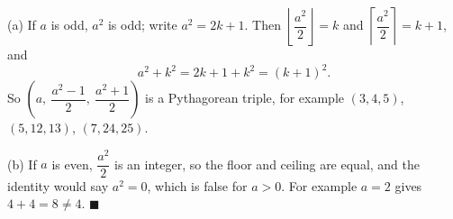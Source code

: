 (a) If \(a\) is odd, \(a^2\) is odd; write \(a^2=2k+1\). Then \(\left\lfloor\dfrac{a^2}{2}\right\rfloor=k\) and \(\left\lceil\dfrac{a^2}{2}\right\rceil=k+1\), and
\[
a^2+k^2=2k+1+k^2=(k+1)^2 .
\]
So \(\left(a,\ \dfrac{a^2-1}{2},\ \dfrac{a^2+1}{2}\right)\) is a Pythagorean triple, for example \((3,4,5)\), \((5,12,13)\), \((7,24,25)\).

(b) If \(a\) is even, \(\dfrac{a^2}{2}\) is an integer, so the floor and ceiling are equal, and the identity would say \(a^2=0\), which is false for \(a>0\). For example \(a=2\) gives \(4+4=8\ne 4\). \(\blacksquare\)
